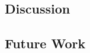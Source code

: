 \hypertarget{discussion}{%
\subsection{Discussion}\label{discussion}}

\hypertarget{future-work}{%
\subsection{Future Work}\label{future-work}}

\begin{Shaded}
\begin{Highlighting}[]

\end{Highlighting}
\end{Shaded}
